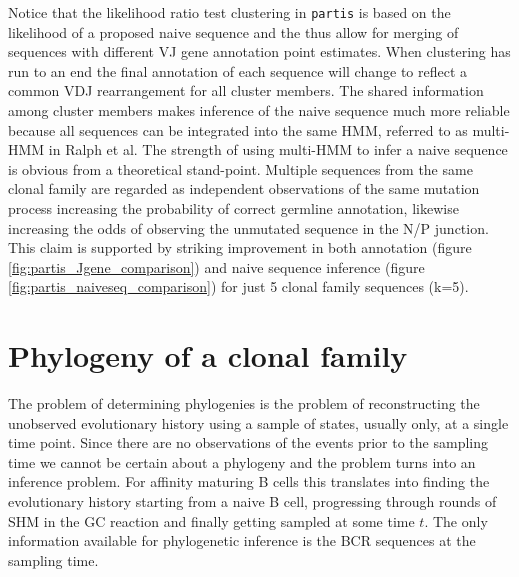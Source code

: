 Notice that the likelihood ratio test clustering in \texttt{partis} is based on the likelihood of a proposed naive sequence and the thus allow for merging of sequences with different VJ gene annotation point estimates.
When clustering has run to an end the final annotation of each sequence will change to reflect a common VDJ rearrangement for all cluster members.
The shared information among cluster members makes inference of the naive sequence much more reliable because all sequences can be integrated into the same HMM, referred to as multi-HMM in Ralph et al.
The strength of using multi-HMM to infer a naive sequence is obvious from a theoretical stand-point.
Multiple sequences from the same clonal family are regarded as independent observations of the same mutation process increasing the probability of correct germline annotation, likewise increasing the odds of observing the unmutated sequence in the N/P junction.
This claim is supported by striking improvement in both annotation (figure \ref{fig:partis_Jgene_comparison}) and naive sequence inference (figure \ref{fig:partis_naiveseq_comparison}) for just 5 clonal family sequences (k=5).












\section{Phylogeny of a clonal family}
The problem of determining phylogenies is the problem of reconstructing the unobserved evolutionary history using a sample of states, usually only, at a single time point.
Since there are no observations of the events prior to the sampling time we cannot be certain about a phylogeny and the problem turns into an inference problem.
For affinity maturing B cells this translates into finding the evolutionary history starting from a naive B cell, progressing through rounds of SHM in the GC reaction and finally getting sampled at some time $t$.
The only information available for phylogenetic inference is the BCR sequences at the sampling time.


